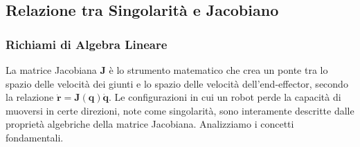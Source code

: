 ﻿\documentclass[11pt, a4paper]{article}
\begin{document}
\newpage
\subsection{Relazione tra Singolarità e Jacobiano}
\subsubsection{Richiami di Algebra Lineare}

La matrice Jacobiana \(\bm{J}\) è lo strumento matematico che crea un ponte tra lo spazio delle velocità dei giunti e lo spazio delle velocità dell'end-effector, secondo la relazione \(\bm{\dot{r}} = \bm{J}(\bm{q})\dot{\bm{q}}\). Le configurazioni in cui un robot perde la capacità di muoversi in certe direzioni, note come singolarità, sono interamente descritte dalle proprietà algebriche della matrice Jacobiana. Analizziamo i concetti fondamentali.
\end{document}
